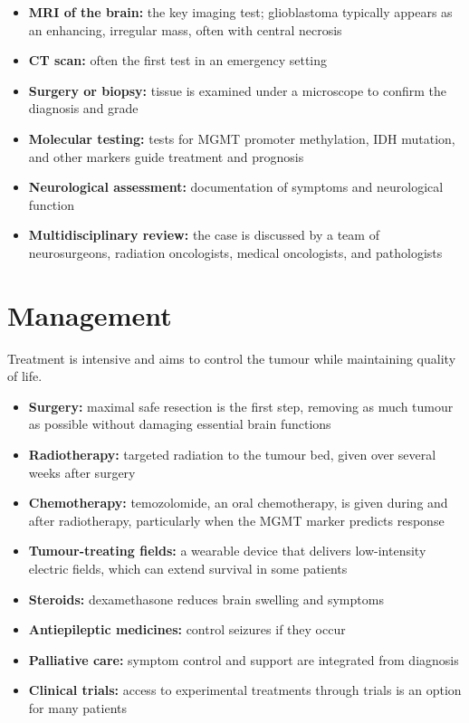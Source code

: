 \begin{itemize}
    \item \textbf{MRI of the brain:} the key imaging test; glioblastoma typically appears as an enhancing, irregular mass, often with central necrosis
    \item \textbf{CT scan:} often the first test in an emergency setting
    \item \textbf{Surgery or biopsy:} tissue is examined under a microscope to confirm the diagnosis and grade
    \item \textbf{Molecular testing:} tests for MGMT promoter methylation, IDH mutation, and other markers guide treatment and prognosis
    \item \textbf{Neurological assessment:} documentation of symptoms and neurological function
    \item \textbf{Multidisciplinary review:} the case is discussed by a team of neurosurgeons, radiation oncologists, medical oncologists, and pathologists
\end{itemize}

\section*{Management}
Treatment is intensive and aims to control the tumour while maintaining quality of life.

\begin{itemize}
    \item \textbf{Surgery:} maximal safe resection is the first step, removing as much tumour as possible without damaging essential brain functions
    \item \textbf{Radiotherapy:} targeted radiation to the tumour bed, given over several weeks after surgery
    \item \textbf{Chemotherapy:} temozolomide, an oral chemotherapy, is given during and after radiotherapy, particularly when the MGMT marker predicts response
    \item \textbf{Tumour-treating fields:} a wearable device that delivers low-intensity electric fields, which can extend survival in some patients
    \item \textbf{Steroids:} dexamethasone reduces brain swelling and symptoms
    \item \textbf{Antiepileptic medicines:} control seizures if they occur
    \item \textbf{Palliative care:} symptom control and support are integrated from diagnosis
    \item \textbf{Clinical trials:} access to experimental treatments through trials is an option for many patients
\end{itemize}

